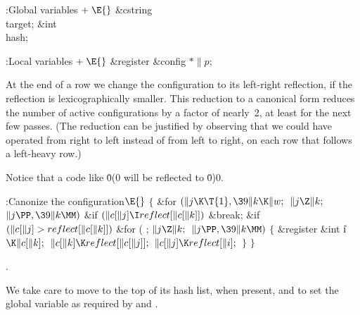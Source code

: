 \B{}:Global variables\X${}\mathrel+\E{}$\6
\&{cstring} \\{target};\6
\&{int} \\{hash};\par
\fi

\B{}:Local variables\X${}\mathrel+\E{}$\6
\&{register} \&{config} ${}{*}\|p{}$;\par
\fi

At the end of a row we change the configuration to its
left-right
reflection, if the reflection is lexicographically smaller. This reduction to
a canonical form reduces the number of active configurations by a factor of
nearly~2, at least for the next few passes. (The reduction can be justified
by observing that we could have operated from right to left instead of from
left to right, on each row that follows a left-heavy row.)

Notice that a code like \.{0(0} will be reflected to \.{0)0}.

\Y\B\4:Canonize the configuration\X${}\E{}$\6
${}\{{}$\1\6
\&{for} ${}(\|j\K\T{1},\39\|k\K\|w;{}$ ${}\|j\Z\|k;{}$ ${}\|j\PP,\39\|k\MM){}$%
\1\6
\&{if} ${}(\|c[\|j]\I\\{reflect}[\|c[\|k]]){}$\1\5
\&{break};\2\2\6
\&{if} ${}(\|c[\|j]>\\{reflect}[\|c[\|k]]){}$\1\6
\&{for} ( ; ${}\|j\Z\|k;{}$ ${}\|j\PP,\39\|k\MM){}$\5
${}\{{}$\1\6
\&{register} \&{int} \|i${}\K\|c[\|k];{}$\7
${}\|c[\|k]\K\\{reflect}[\|c[\|j]];{}$\6
${}\|c[\|j]\K\\{reflect}[\|i];{}$\6
\4${}\}{}$\2\2\6
\4${}\}{}$\2\par
{}.\fi

We take care to move  to the top of its hash
list, when present,
and to set the global variable  as required by 
and .


